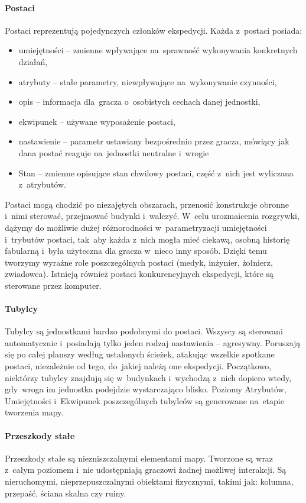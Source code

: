 \documentclass[licencjacka]{pracamgr}
\begin{document}
      \paragraph{Postaci}
      	Postaci reprezentują pojedynczych członków ekspedycji. Każda z~postaci posiada:
      	\begin{itemize}
      	  \item umiejętności -- zmienne wpływające na~sprawność wykonywania konkretnych działań,
      	  \item atrybuty -- stałe parametry, niewpływające na~wykonywanie czynności,
	        \item opis -- informacja dla~gracza o~osobistych cechach danej jednostki,
          \item ekwipunek -- używane wyposażenie postaci,
          \item nastawienie -- parametr ustawiany bezpośrednio przez gracza, mówiący jak dana postać reaguje na~jednostki
          neutralne i~wrogie
	        \item Stan -- zmienne opisujące stan chwilowy postaci, część z~nich jest wyliczana z~atrybutów.
      	\end{itemize}
      	Postaci mogą chodzić po niezajętych obszarach, przenosić konstrukcje obronne i~nimi sterować,	przejmować budynki
      	i~walczyć. W~celu urozmaicenia rozgrywki, dążymy do możliwie dużej różnorodności w~parametryzacji	umiejętności
      	i~trybutów postaci, tak~aby każda z~nich mogła mieć ciekawą, osobną historię fabularną i~była użyteczna
      	dla gracza w~nieco inny sposób. Dzięki temu tworzymy wyraźne role poszczególnych postaci (medyk, inżynier,
      	żołnierz,	zwiadowca).	Istnieją również postaci konkurencyjnych ekspedycji, które są sterowane przez komputer.
      \paragraph{Tubylcy}
        Tubylcy są jednostkami bardzo podobnymi do postaci. Wszyscy są sterowani automatycznie i~posiadają tylko jeden
        rodzaj nastawienia -- agresywny. Poruszają się po całej planszy według ustalonych ścieżek, atakując wszelkie
        spotkane postaci, niezależnie od tego, do~jakiej należą one ekspedycji. Początkowo, niektórzy tubylcy znajdują się
        w~budynkach i~wychodzą z~nich dopiero wtedy, gdy~wroga im jednostka podejdzie wystarczająco blisko. Poziomy
        Atrybutów, Umiejętności i~Ekwipunek poszczególnych tubylców są generowane na~etapie tworzenia mapy.
      \paragraph{Przeszkody stałe}
        Przeszkody stałe są niezniszczalnymi elementami mapy. Tworzone są wraz z~całym poziomem i~nie udostępniają graczowi
        żadnej możliwej interakcji. Są nieruchomymi, nieprzepuszczalnymi obiektami fizycznymi, takimi jak: kolumna,
        przepaść, ściana skalna czy ruiny.
\end{document}
